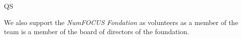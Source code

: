 \begin{sitedescription}{QS}
\begin{compactenum}
\item We also support the \emph{NumFOCUS Fondation} as volunteers as a member of the team is a member of the board of directors of the foundation.

\end{compactenum}


\end{sitedescription}

